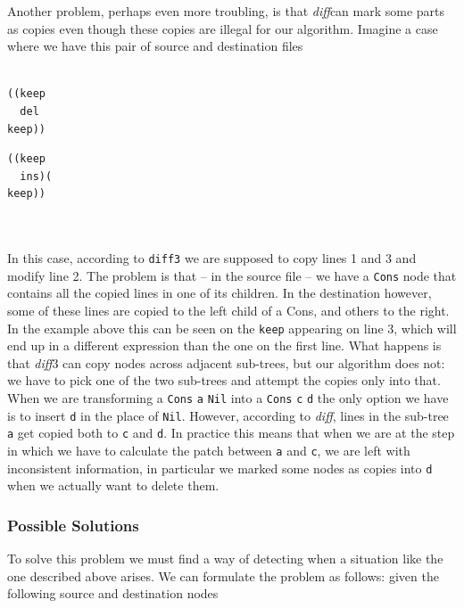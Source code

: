 \documentclass[11pt, titlepage]{article}
\newcommand{\toHaskell}[1]{\texttt{#1}\xspace}
\newcommand{\toClojure}[1]{\texttt{#1}\xspace}
\newcommand{\diff}{\emph{diff}}
\begin{document}
Another problem, perhaps even more troubling, is that \diff can mark some parts as copies even though these copies are illegal for our algorithm. 
Imagine a case where we have this pair of source and destination files
\\
\\
\begin{minipage}{0.5\textwidth}
\begin{verbatim}
((keep
  del
keep))
\end{verbatim}
\end{minipage}
\begin{minipage}{0.5\textwidth}
\begin{verbatim}
((keep
  ins)(
keep))
\end{verbatim}
\end{minipage}
\\
\\
In this case, according to \texttt{diff3} we are supposed to copy lines 1 and 3 
and modify line 2. The problem is that -- in the source file -- we have a \toHaskell{Cons} node 
that contains all the copied lines in one of its children. In the destination 
however, some of these lines are copied to the left child of a Cons, and others 
to the right. In the example above this can be seen on the \toClojure{keep} appearing on line 3, which will end up in a different expression than the one on the first line. 
What happens is that \diff3 can copy nodes across adjacent sub-trees, but our algorithm does not: we have to pick one of the two sub-trees and attempt the copies only into that.
\\
When we are transforming a \toHaskell{Cons} \toHaskell{a} \toHaskell{Nil} into a \toHaskell{Cons} \toHaskell{c} \toHaskell{d} the only option we have is to insert \toHaskell{d} in the place of \toHaskell{Nil}. 
However, according to \diff, lines in the sub-tree \toHaskell{a} get copied both to \toHaskell{c} and \toHaskell{d}. In practice this means that when we are at the step in which we have to calculate the patch between \toHaskell{a} and \toHaskell{c}, we are left with inconsistent information, in particular we marked some nodes as copies into \toHaskell{d} when we actually want to delete them.

\subsubsection*{Possible Solutions}

To solve this problem we must find a way of detecting when a situation like the 
one described above arises. We can formulate the problem as follows:
given the following source and destination nodes
\end{document}
